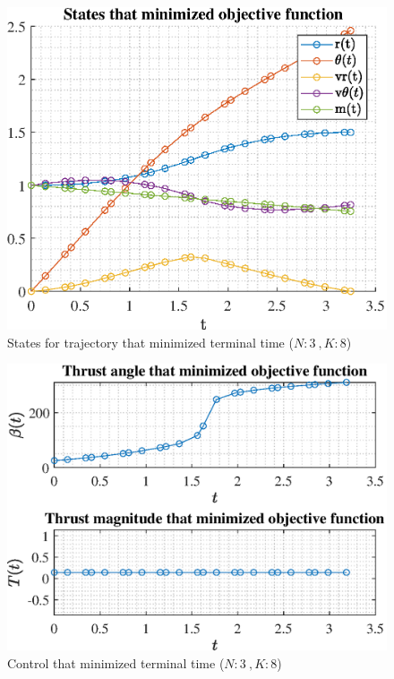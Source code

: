 \documentclass[]{article}
\begin{document}
\begin{figure}
	\centering
	\includegraphics[scale=0.75]{states_N3_K8_C3_tf.eps}
	\caption{States for trajectory that minimized terminal time (\(N:3\ , K:8\))}
	\label{fig:states_N3_K8_C3_tf}
\end{figure}
\begin{figure}
	\centering
	\includegraphics[scale=0.75]{control_N3_K8_C3_tf.eps}
	\caption{Control that minimized terminal time (\(N:3\ , K:8\))}
	\label{fig:control_N3_K8_C3_tf}
\end{figure}
\end{document}
